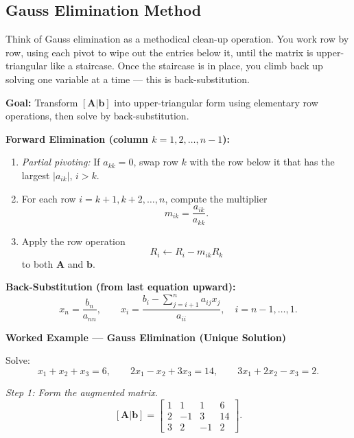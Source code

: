 \documentclass[12pt,a4paper]{article}
\begin{document}
\subsection{Gauss Elimination Method}

Think of Gauss elimination as a methodical clean-up operation.
You work row by row, using each pivot to wipe out the entries below it, until the matrix is
upper-triangular like a staircase.
Once the staircase is in place, you climb back up solving one variable at a time --- this is back-substitution.

\begin{infobox}
\textbf{Goal:} Transform $[\mathbf{A}|\mathbf{b}]$ into upper-triangular form using elementary row operations,
then solve by back-substitution.

\textbf{Forward Elimination (column $k = 1, 2, \ldots, n-1$):}
\begin{enumerate}[leftmargin=2em]
  \item \textit{Partial pivoting:} If $a_{kk} = 0$, swap row $k$ with the row below it that has the largest
        $|a_{ik}|$, $i > k$.
  \item For each row $i = k+1, k+2, \ldots, n$, compute the multiplier
        \[
          m_{ik} = \frac{a_{ik}}{a_{kk}}.
        \]
  \item Apply the row operation
        \[
          R_i \leftarrow R_i - m_{ik} R_k
        \]
        to both $\mathbf{A}$ and $\mathbf{b}$.
\end{enumerate}

\textbf{Back-Substitution (from last equation upward):}
\[
  x_n = \frac{b_n}{a_{nn}}, \qquad
  x_i = \frac{b_i - \displaystyle\sum_{j=i+1}^{n} a_{ij} x_j}{a_{ii}}, \quad i = n-1, \ldots, 1.
\]
\end{infobox}

\textbf{Worked Example --- Gauss Elimination (Unique Solution)}

Solve:
\[
x_1 + x_2 + x_3 = 6, \qquad 2x_1 - x_2 + 3x_3 = 14, \qquad 3x_1 + 2x_2 - x_3 = 2.
\]

\textit{Step 1: Form the augmented matrix.}
\[
[\mathbf{A}|\mathbf{b}] =
\left[\begin{array}{ccc|c}
1 & 1 & 1 & 6 \\
2 & -1 & 3 & 14 \\
3 & 2 & -1 & 2
\end{array}\right].
\]
\end{document}
